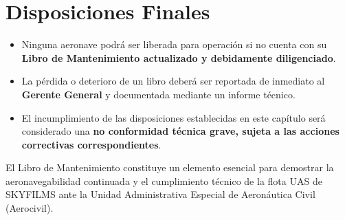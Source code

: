 \section{Disposiciones Finales}

\begin{itemize}
    \item Ninguna aeronave podrá ser liberada para operación si no cuenta con su \textbf{Libro de Mantenimiento actualizado y debidamente diligenciado}.

    \item La pérdida o deterioro de un libro deberá ser reportada de inmediato al \textbf{Gerente General} y documentada mediante un informe técnico.

    \item El incumplimiento de las disposiciones establecidas en este capítulo será considerado una \textbf{no conformidad técnica grave, sujeta a las acciones correctivas correspondientes}.
\end{itemize}

El Libro de Mantenimiento constituye un elemento esencial para demostrar la aeronavegabilidad continuada y el cumplimiento técnico de la flota UAS de SKYFILMS ante la Unidad Administrativa Especial de Aeronáutica Civil (Aerocivil).